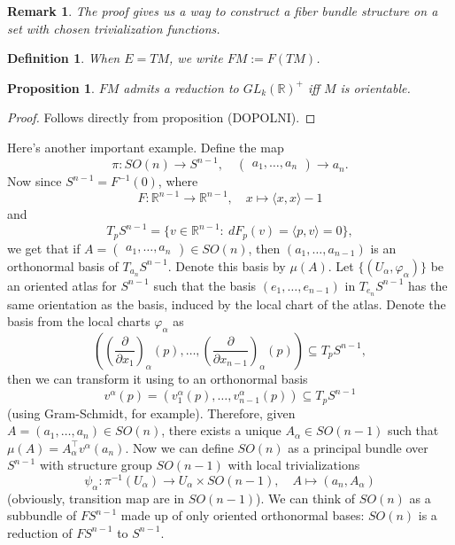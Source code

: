 \documentclass[10pt, a4paper]{article}
\newtheorem{proposition}[thm]{Proposition}
\newtheorem{defi}[thm]{Definition}
\newenvironment{noticeB}{%
  \tcolorbox[%
  notitle,
  empty,
  enhanced,  %
  breakable,
  coltext=black,
  colback=white, 
  fontupper=\rmfamily,
  noparskip,
  sharp corners,
  boxrule=-1pt,  %
  frame hidden,
  left=7pt,  %
  right=7pt,
  top=5pt,
  bottom=5pt,
  before skip=2.5ex plus 2pt,
  after skip=2.5ex plus 2pt,
  borderline west = {1.5pt}{-0.1pt}{blue!30!black}, %
  overlay unbroken and last={%
    \draw[color=black, line width=1.25pt]
    ($(frame.south west)+(1.pt, -0.1pt)$) -- ++(2em, 0);
  }
  ]}
{\endtcolorbox}
\newenvironment{definition}{\begin{noticeB}\begin{defi}}{%
    \end{defi}\end{noticeB}}
\newtheorem*{remark}{Remark}
\newenvironment{noticeC}{%
  \tcolorbox[%
  notitle,
  empty,
  enhanced,  %
  breakable,
  coltext=black, 
  fontupper=\rmfamily,
  noparskip,
  sharp corners,
  boxrule=-1pt,  %
  frame hidden,
  left=7pt,  %
  right=7pt,
  top=5pt,
  bottom=5pt,
  before skip=2.5ex plus 2pt,
  after skip=2.5ex plus 2pt,
  overlay unbroken and last={%
  },
  ]}
{\endtcolorbox}
\newenvironment{myproof}%
  {\begin{noticeC}\begin{proof}}%
  {\end{proof}\end{noticeC}}
\newcommand{\R}{\mathbb {R}}
\begin{document}
\begin{remark}
  The proof gives us a way to construct a fiber bundle structure on a set with chosen trivialization functions.
\end{remark}

\begin{definition}
  When $E = TM$, we write $F M := F(TM)$.
\end{definition}

\begin{proposition}
  $FM$ admits a reduction to $GL_k(\R) ^+$ iff $M$ is orientable. 
\end{proposition}

\begin{myproof}
  Follows directly from proposition (DOPOLNI).
\end{myproof}

Here's another important example. Define the map 
$$\pi: SO(n) \to S^{n - 1},\quad \begin{pmatrix}
  a_1, \dots, a_n
\end{pmatrix} \to a_n.$$
Now since $S^{n - 1} = F^{-1} (0)$, where 
$$F: \R^{n - 1} \to \R^{n - 1},\quad x \mapsto \langle x, x\rangle - 1$$
and
$$T_p S^{n - 1} = \{v \in \R^{n - 1}:\ dF_p (v) = \langle p, v \rangle = 0\},$$
we get that if $A = \begin{pmatrix}
  a_1, \dots, a_n
\end{pmatrix} \in SO(n)$, then $(a_1, \dots, a_{n - 1})$ is an orthonormal basis of $T_{a_n} S^{n - 1}$.
Denote this basis by $\mu (A)$. Let $\{(U_\alpha, \varphi_\alpha)\}$ be an oriented atlas for $S^{n - 1}$
such that the basis $(e_1, \dots, e_{n - 1})$ in $T_{e_n} S^{n - 1}$ has the same orientation as the basis, induced by the local chart of the atlas.
Denote the basis from the local charts $\varphi_\alpha$ as 
$$\left(\left(\frac{\partial}{\partial x_1}\right)_\alpha (p),\dots, \left(\frac{\partial}{\partial x_{n - 1}}\right)_\alpha (p)\right) \subseteq T_p S^{n - 1},$$
then we can transform it using to an orthonormal basis 
$$v^\alpha (p) = (v_1 ^\alpha (p),\dots, v_{n - 1} ^\alpha (p)) \subseteq T_p S^{n - 1}$$
(using Gram-Schmidt, for example). Therefore, given $A = (a_1, \dots, a_n) \in SO(n)$,
there exists a unique $A_\alpha \in SO(n - 1)$ such that $\mu (A) = A_\alpha ^\top v^\alpha (a_n)$.
Now we can define $SO(n)$ as a principal bundle over $S^{n - 1}$ with structure group $SO(n - 1)$ with local trivializations 
$$\psi_\alpha: \pi^{-1} (U_\alpha) \to U_\alpha \times SO(n - 1),\quad A \mapsto (a_n, A_\alpha)$$
(obviously, transition map are in $SO(n - 1)$). We can think of $SO(n)$ as a subbundle of $F S^{n - 1}$
made up of only oriented orthonormal bases: $SO(n)$ is a reduction of $F S^{n - 1}$ to $S^{n - 1}$.
\end{document}
